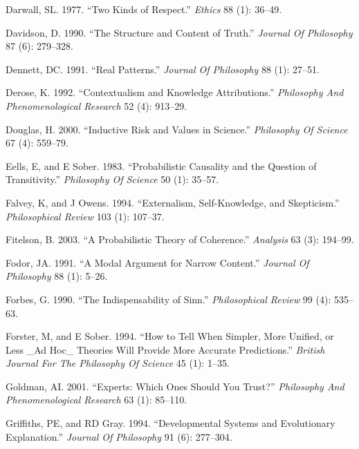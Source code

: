 \documentclass[
  10pt,
  letterpaper,
  DIV=11,
  numbers=noendperiod,
  twoside]{scrartcl}
\newlength{\cslhangindent}
\newenvironment{CSLReferences}[2] %
 {\begin{list}{}{%
  \setlength{\itemindent}{0pt}
  \setlength{\leftmargin}{0pt}
  \setlength{\parsep}{0pt}
  \ifodd #1
   \setlength{\leftmargin}{\cslhangindent}
   \setlength{\itemindent}{-1\cslhangindent}
  \fi
  \setlength{\itemsep}{#2\baselineskip}}}
 {\end{list}}
\begin{document}
\begin{CSLReferences}{1}{0}
Darwall, SL. 1977. {``Two Kinds of Respect.''} \emph{Ethics} 88 (1):
36--49.

Davidson, D. 1990. {``The Structure and Content of Truth.''}
\emph{Journal Of Philosophy} 87 (6): 279--328.

Dennett, DC. 1991. {``Real Patterns.''} \emph{Journal Of Philosophy} 88
(1): 27--51.

Derose, K. 1992. {``Contextualism and Knowledge Attributions.''}
\emph{Philosophy And Phenomenological Research} 52 (4): 913--29.

Douglas, H. 2000. {``Inductive Risk and Values in Science.''}
\emph{Philosophy Of Science} 67 (4): 559--79.

Eells, E, and E Sober. 1983. {``Probabilistic Causality and the Question
of Transitivity.''} \emph{Philosophy Of Science} 50 (1): 35--57.

Falvey, K, and J Owens. 1994. {``Externalism, Self-Knowledge, and
Skepticism.''} \emph{Philosophical Review} 103 (1): 107--37.

Fitelson, B. 2003. {``A Probabilistic Theory of Coherence.''}
\emph{Analysis} 63 (3): 194--99.

Fodor, JA. 1991. {``A Modal Argument for Narrow Content.''}
\emph{Journal Of Philosophy} 88 (1): 5--26.

Forbes, G. 1990. {``The Indispensability of Sinn.''} \emph{Philosophical
Review} 99 (4): 535--63.

Forster, M, and E Sober. 1994. {``How to Tell When Simpler, More
Unified, or Less \_Ad Hoc\_ Theories Will Provide More Accurate
Predictions.''} \emph{British Journal For The Philosophy Of Science} 45
(1): 1--35.

Goldman, AI. 2001. {``Experts: Which Ones Should You Trust?''}
\emph{Philosophy And Phenomenological Research} 63 (1): 85--110.

Griffiths, PE, and RD Gray. 1994. {``Developmental Systems and
Evolutionary Explanation.''} \emph{Journal Of Philosophy} 91 (6):
277--304.


\end{CSLReferences}
\end{document}
